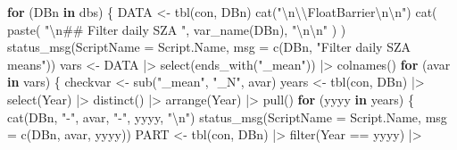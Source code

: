 \documentclass[
  10pt,
  a4paper,oneside]{article}
\newenvironment{Shaded}{\begin{snugshade}}{\end{snugshade}}
\newcommand{\AttributeTok}[1]{\textcolor[rgb]{0.77,0.63,0.00}{#1}}
\newcommand{\ControlFlowTok}[1]{\textcolor[rgb]{0.13,0.29,0.53}{\textbf{#1}}}
\newcommand{\FunctionTok}[1]{\textcolor[rgb]{0.00,0.00,0.00}{#1}}
\newcommand{\NormalTok}[1]{#1}
\newcommand{\OtherTok}[1]{\textcolor[rgb]{0.56,0.35,0.01}{#1}}
\newcommand{\SpecialCharTok}[1]{\textcolor[rgb]{0.00,0.00,0.00}{#1}}
\newcommand{\StringTok}[1]{\textcolor[rgb]{0.31,0.60,0.02}{#1}}
\begin{document}
\begin{Shaded}
\begin{Highlighting}[]
\ControlFlowTok{for}\NormalTok{ (DBn }\ControlFlowTok{in}\NormalTok{ dbs) \{}
\NormalTok{    DATA }\OtherTok{\textless{}{-}} \FunctionTok{tbl}\NormalTok{(con, DBn)}
    \FunctionTok{cat}\NormalTok{(}\StringTok{"}\SpecialCharTok{\textbackslash{}n\textbackslash{}\textbackslash{}}\StringTok{FloatBarrier}\SpecialCharTok{\textbackslash{}n\textbackslash{}n}\StringTok{"}\NormalTok{)}
    \FunctionTok{cat}\NormalTok{(}
        \FunctionTok{paste}\NormalTok{(}
            \StringTok{"}\SpecialCharTok{\textbackslash{}n}\StringTok{\#\# Filter daily SZA "}\NormalTok{, }\FunctionTok{var\_name}\NormalTok{(DBn),}
            \StringTok{"}\SpecialCharTok{\textbackslash{}n\textbackslash{}n}\StringTok{"}
\NormalTok{        )}
\NormalTok{    )}
    \FunctionTok{status\_msg}\NormalTok{(}\AttributeTok{ScriptName =}\NormalTok{ Script.Name, }\AttributeTok{msg =} \FunctionTok{c}\NormalTok{(DBn, }\StringTok{"Filter daily SZA means"}\NormalTok{))}
\NormalTok{    vars }\OtherTok{\textless{}{-}}\NormalTok{ DATA }\SpecialCharTok{|\textgreater{}}
        \FunctionTok{select}\NormalTok{(}\FunctionTok{ends\_with}\NormalTok{(}\StringTok{"\_mean"}\NormalTok{)) }\SpecialCharTok{|\textgreater{}}
        \FunctionTok{colnames}\NormalTok{()}
    \ControlFlowTok{for}\NormalTok{ (avar }\ControlFlowTok{in}\NormalTok{ vars) \{}
\NormalTok{        checkvar }\OtherTok{\textless{}{-}} \FunctionTok{sub}\NormalTok{(}\StringTok{"\_mean"}\NormalTok{, }\StringTok{"\_N"}\NormalTok{, avar)}
\NormalTok{        years }\OtherTok{\textless{}{-}} \FunctionTok{tbl}\NormalTok{(con, DBn) }\SpecialCharTok{|\textgreater{}}
            \FunctionTok{select}\NormalTok{(Year) }\SpecialCharTok{|\textgreater{}}
            \FunctionTok{distinct}\NormalTok{() }\SpecialCharTok{|\textgreater{}}
            \FunctionTok{arrange}\NormalTok{(Year) }\SpecialCharTok{|\textgreater{}}
            \FunctionTok{pull}\NormalTok{()}
        \ControlFlowTok{for}\NormalTok{ (yyyy }\ControlFlowTok{in}\NormalTok{ years) \{}
            \FunctionTok{cat}\NormalTok{(DBn, }\StringTok{"{-}"}\NormalTok{, avar, }\StringTok{"{-}"}\NormalTok{, yyyy, }\StringTok{"}\SpecialCharTok{\textbackslash{}n}\StringTok{"}\NormalTok{)}
            \FunctionTok{status\_msg}\NormalTok{(}\AttributeTok{ScriptName =}\NormalTok{ Script.Name, }\AttributeTok{msg =} \FunctionTok{c}\NormalTok{(DBn, avar, yyyy))}
\NormalTok{            PART }\OtherTok{\textless{}{-}} \FunctionTok{tbl}\NormalTok{(con, DBn) }\SpecialCharTok{|\textgreater{}}
                \FunctionTok{filter}\NormalTok{(Year }\SpecialCharTok{==}\NormalTok{ yyyy) }\SpecialCharTok{|\textgreater{}}

\end{Highlighting}
\end{Shaded}
\end{document}
